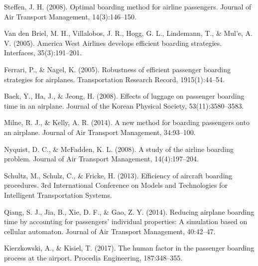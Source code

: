 \documentclass[12pt]{article}
\begin{document}
\begin{thebibliography}{9}

Steffen, J. H. (2008). Optimal boarding method for airline passengers. Journal of Air Transport Management, 14(3):146--150.

Van den Briel, M. H., Villalobos, J. R., Hogg, G. L., Lindemann, T., \& Mul'e, A. V. (2005). America West Airlines develops efficient boarding strategies. Interfaces, 35(3):191--201.

Ferrari, P., \& Nagel, K. (2005). Robustness of efficient passenger boarding strategies for airplanes. Transportation Research Record, 1915(1):44--54.

Baek, Y., Ha, J., \& Jeong, H. (2008). Effects of luggage on passenger boarding time in an airplane. Journal of the Korean Physical Society, 53(11):3580--3583.

Milne, R. J., \& Kelly, A. R. (2014). A new method for boarding passengers onto an airplane. Journal of Air Transport Management, 34:93--100.

Nyquist, D. C., \& McFadden, K. L. (2008). A study of the airline boarding problem. Journal of Air Transport Management, 14(4):197--204.

Schultz, M., Schulz, C., \& Fricke, H. (2013). Efficiency of aircraft boarding procedures. 3rd International Conference on Models and Technologies for Intelligent Transportation Systems.

Qiang, S. J., Jia, B., Xie, D. F., \& Gao, Z. Y. (2014). Reducing airplane boarding time by accounting for passengers' individual properties: A simulation based on cellular automaton. Journal of Air Transport Management, 40:42--47.

Kierzkowski, A., \& Kisiel, T. (2017). The human factor in the passenger boarding process at the airport. Procedia Engineering, 187:348--355.

\end{thebibliography}
\end{document}
